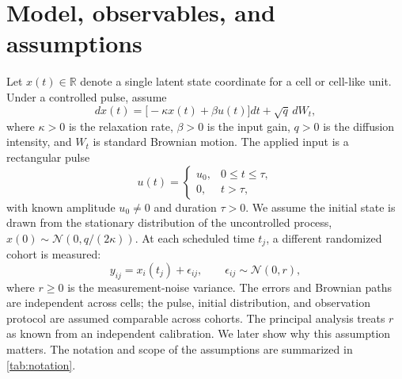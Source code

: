 \documentclass[11pt,a4paper]{article}
\newcommand{\R}{\mathbb{R}}
\begin{document}
\section{Model, observables, and assumptions}
Let $x(t)\in\R$ denote a single latent state coordinate for a cell or cell-like unit. Under a controlled pulse, assume
\begin{equation}
dx(t)=\big[-\kappa x(t)+\beta u(t)\big]dt+\sqrt{q}\,dW_t,
\label{eq:sde}
\end{equation}
where $\kappa>0$ is the relaxation rate, $\beta>0$ is the input gain, $q>0$ is the diffusion intensity, and $W_t$ is standard Brownian motion. The applied input is a rectangular pulse
\begin{equation}
u(t)=
\begin{cases}
u_0,&0\le t\le \tau,\\
0,&t>\tau,
\end{cases}
\label{eq:pulse}
\end{equation}
with known amplitude $u_0\ne0$ and duration $\tau>0$. We assume the initial state is drawn from the stationary distribution of the uncontrolled process, $x(0)\sim\mathcal{N}(0,q/(2\kappa))$. At each scheduled time $t_j$, a different randomized cohort is measured:
\begin{equation}
y_{ij}=x_i(t_j)+\epsilon_{ij},\qquad
\epsilon_{ij}\sim\mathcal{N}(0,r),
\label{eq:observation}
\end{equation}
where $r\ge0$ is the measurement-noise variance. The errors and Brownian paths are independent across cells; the pulse, initial distribution, and observation protocol are assumed comparable across cohorts. The principal analysis treats $r$ as known from an independent calibration. We later show why this assumption matters. The notation and scope of the assumptions are summarized in \cref{tab:notation}.
\end{document}
